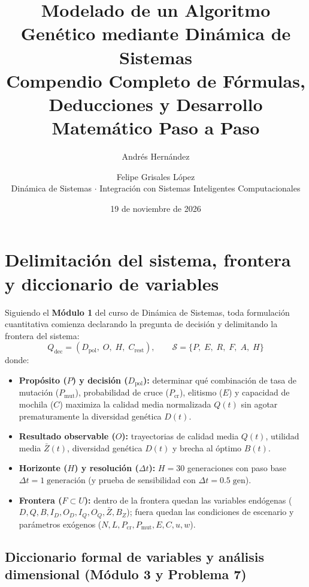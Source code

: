 \documentclass[11pt,a4paper]{article}
\title{\textbf{\color{Navy}Modelado de un Algoritmo Gen\'etico mediante Din\'amica de Sistemas}\\[6pt]
\large Compendio Completo de F\'ormulas, Deducciones y Desarrollo Matem\'atico Paso a Paso}
\author{Andr\'es Hern\'andez \and Felipe Grisales L\'opez\\[4pt]
\small Din\'amica de Sistemas $\cdot$ Integraci\'on con Sistemas Inteligentes Computacionales}
\date{19 de noviembre de 2026}
\begin{document}
\maketitle
\tableofcontents
\newpage

\section{Delimitaci\'on del sistema, frontera y diccionario de variables}

Siguiendo el \textbf{M\'odulo 1} del curso de Din\'amica de Sistemas, toda formulaci\'on cuantitativa comienza declarando la pregunta de decisi\'on y delimitando la frontera del sistema:
\begin{equation}
Q_{\text{dec}} = (D_{\text{pol}},\; O,\; H,\; C_{\text{rest}}), \qquad
\mathcal{S} = \{P,\; E,\; R,\; F,\; A,\; H\}
\end{equation}
donde:
\begin{itemize}[leftmargin=1.5em]
    \item \textbf{Prop\'osito ($P$) y decisi\'on ($D_{\text{pol}}$):} determinar qu\'e combinaci\'on de tasa de mutaci\'on ($P_{\text{mut}}$), probabilidad de cruce ($P_{\text{cr}}$), elitismo ($E$) y capacidad de mochila ($C$) maximiza la calidad media normalizada $Q(t)$ sin agotar prematuramente la diversidad gen\'etica $D(t)$.
    \item \textbf{Resultado observable ($O$):} trayectorias de calidad media $Q(t)$, utilidad media $\bar{Z}(t)$, diversidad gen\'etica $D(t)$ y brecha al \'optimo $B(t)$.
    \item \textbf{Horizonte ($H$) y resoluci\'on ($\Delta t$):} $H = 30$ generaciones con paso base $\Delta t = 1\;\text{generaci\'on}$ (y prueba de sensibilidad con $\Delta t = 0.5\;\text{gen}$).
    \item \textbf{Frontera ($F \subset U$):} dentro de la frontera quedan las variables end\'ogenas ($D, Q, B, I_D, O_D, I_Q, O_Q, \bar{Z}, B_Z$); fuera quedan las condiciones de escenario y par\'ametros ex\'ogenos ($N, L, P_{\text{cr}}, P_{\text{mut}}, E, C, u, w$).
\end{itemize}

\subsection{Diccionario formal de variables y an\'alisis dimensional (M\'odulo 3 y Problema 7)}
\end{document}
